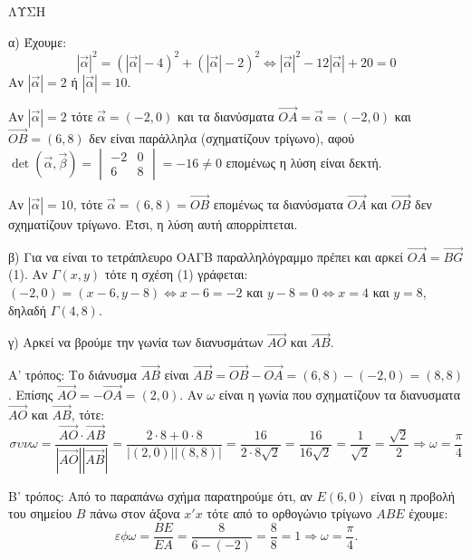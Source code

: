 ΛΥΣΗ

α) Έχουμε:
\[ \left|\vec{\alpha}\right|^2 = (\left|\vec{\alpha}\right|-4)^2 + (\left|\vec{\alpha}\right|-2)^2 \Leftrightarrow \left|\vec{\alpha}\right|^2 - 12\left|\vec{\alpha}\right| + 20 = 0 \]
Αν $\left|\vec{\alpha}\right| = 2$ ή $\left|\vec{\alpha}\right| = 10$.

Αν $\left|\vec{\alpha}\right| = 2$ τότε $\vec{\alpha} = (-2,0)$ και τα διανύσματα $\vec{OA} = \vec{\alpha} = (-2,0)$ και $\vec{OB} = (6,8)$ δεν είναι παράλληλα (σχηματίζουν τρίγωνο), αφού $\det(\vec{\alpha}, \vec{\beta}) = \begin{vmatrix} -2 & 0 \\ 6 & 8 \end{vmatrix} = -16 \ne 0$ επομένως η λύση είναι δεκτή.

Αν $\left|\vec{\alpha}\right| = 10$, τότε $\vec{\alpha} = (6,8) = \vec{OB}$ επομένως τα διανύσματα $\vec{OA}$ και $\vec{OB}$ δεν σχηματίζουν τρίγωνο. Έτσι, η λύση αυτή απορρίπτεται.

β) Για να είναι το τετράπλευρο ΟΑΓΒ παραλληλόγραμμο πρέπει και αρκεί $\vec{OA} = \vec{BG}$ (1).
Αν $\Gamma(x,y)$ τότε η σχέση (1) γράφεται:
$(-2,0) = (x-6, y-8) \Leftrightarrow x-6 = -2$ και $y-8 = 0 \Leftrightarrow x = 4$ και $y = 8$, δηλαδή $\Gamma(4,8)$.

γ) Αρκεί να βρούμε την γωνία των διανυσμάτων $\vec{AO}$ και $\vec{AB}$.


Α' τρόπος:
Το διάνυσμα $\vec{AB}$ είναι $\vec{AB} = \vec{OB} - \vec{OA} = (6,8) - (-2,0) = (8,8)$. Επίσης $\vec{AO} = -\vec{OA} = (2,0)$.
Αν $\omega$ είναι η γωνία που σχηματίζουν τα διανυσματα $\vec{AO}$ και $\vec{AB}$, τότε:
\[ \sigma\upsilon\nu\omega = \frac{\vec{AO} \cdot \vec{AB}}{\left|\vec{AO}\right|\left|\vec{AB}\right|} = \frac{2 \cdot 8 + 0 \cdot 8}{\left|(2,0)\right|\left|(8,8)\right|} = \frac{16}{2 \cdot 8\sqrt{2}} = \frac{16}{16\sqrt{2}} = \frac{1}{\sqrt{2}} = \frac{\sqrt{2}}{2} \Rightarrow \omega = \frac{\pi}{4} \]

Β' τρόπος:
Από το παραπάνω σχήμα παρατηρούμε ότι, αν $E(6,0)$ είναι η προβολή του σημείου $B$ πάνω στον άξονα $x'x$ τότε από το ορθογώνιο τρίγωνο $ABE$ έχουμε:
\[ \varepsilon\phi\omega = \frac{BE}{EA} = \frac{8}{6-(-2)} = \frac{8}{8} = 1 \Rightarrow \omega = \frac{\pi}{4}. \]
\endlysh
